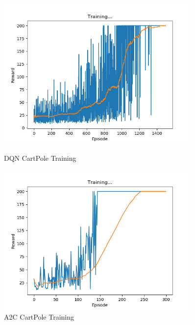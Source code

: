 \documentclass[12pt,a4paper]{article}
\begin{document}
\begin{figure}[!h]
	\centering
	\begin{minipage}{.5\textwidth}
		\centering
		\includegraphics[width=0.9\textwidth]{gfx/dqn_cartpole_model_1500}
		\caption{DQN CartPole Training}
		\label{fig:pract:cartpole:dqn}
	\end{minipage}%
	\begin{minipage}{.5\textwidth}
		\centering
		\includegraphics[width=0.9\textwidth]{gfx/model_300}
		\caption{A2C CartPole Training}
		\label{fig:pract:cartpole:a2c}
	\end{minipage}
\end{figure}

\newpage
\end{document}
